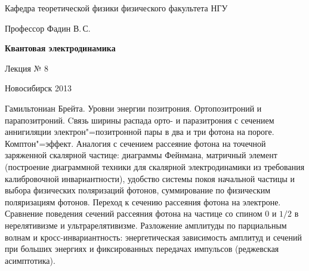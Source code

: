 \documentclass[12pt,pagesize,paper=landscape,paper=192mm:108mm]{scrbook}
\begin{document}
\begin{titlepage}
\begin{center}
    Кафедра теоретической физики физического факультета НГУ
    \medskip

    \Large
    Профессор Фадин В.\,С.
    \bigskip

    \huge
    \textbf{Квантовая электродинамика}
    \bigskip

    \Large
    Лекция № 8
    \vfill

    \normalsize
    \vfill

    \normalsize \ccbysa\hspace{0.5em}  Новосибирск 2013
  \end{center}
\end{titlepage}
\vspace*{-1em}
\begin{center}
\vfill
  \begin{minipage}{0.75\linewidth}
    Гамильтониан Брейта. Уровни энергии позитрония. Ортопозитроний и
    парапозитроний. Cвязь ширины распада орто- и паразитрония с
    сечением аннигиляции электрон"=позитронной пары в два и три фотона
    на пороге. Комптон"=эффект. Аналогия с сечением рассеяние фотона на
    точечной заряженной скалярной частице: диаграммы Фейнмана,
    матричный элемент (построение диаграммной техники для скалярной
    электродинамики из требования калибровочной инвариантности),
    удобство системы покоя начальной частицы и выбора физических
    поляризаций фотонов, суммирование по физическим поляризациям
    фотонов.  Переход к сечению рассеяния фотона на
    электроне. Сравнение поведения сечений рассеяния фотона на частице
    со спином 0 и $1/2$ в нерелятивизме и ультрарелятивизме. Разложение
    амплитуды по парциальным волнам и кросс-инвариантность:
    энергетическая зависимость амплитуд и сечений при больших энергиях
    и фиксированных передачах импульсов (реджевская асимптотика).
  \end{minipage}
  \vfill

\end{center}
\end{document}
